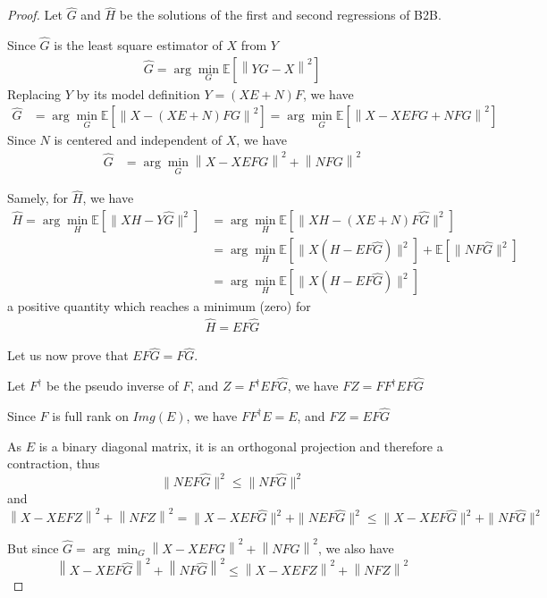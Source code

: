\documentclass{article}
\begin{document}
\begin{proof}

 Let $\hat G$ and $\hat H$ be the solutions of the first and second regressions of B2B.

 Since $\hat G$ is the least square estimator of $X$ from $Y$
 \begin{align*}
    \hat G = \arg \min_G \mathbb{E}[\left \| YG - X \right \|^2]
\end{align*}
Replacing $Y$ by its model definition $Y = (XE+N)F$, we have
 \begin{align*}
    \hat G &=   \arg \min_G \mathbb{E}[\left \| X - (XE + N)FG \right\|^2] =\arg \min_G \mathbb{E}[\left \| X - XEFG + NFG \right\|^2]
  \end{align*}
  Since $N$ is centered and independent of $X$, we have
  \begin{align}
    	  \hat G &=  \arg \min_G \left \| X - XEFG\right\| ^2  + \left \| NFG\right \| ^2
     \label{eq:Gdoublenorm}
\end{align}

Samely, for $\hat H$, we have
\begin{align*}
    \hat H = \arg \min_H \mathbb{E}[\| XH - Y \hat{G} \|^2] &=\arg  \min_H \mathbb{E}[\| XH - (XE + N)F \hat G \|^2] \\
    &=\arg \min_H \mathbb{E}[\| X(H - EF \hat G) \| ^2] + \mathbb{E}[\| NF\hat G \| ^2]\\
    &= \arg \min_H \mathbb{E}[\| X(H - EF \hat G) \| ^2]
 \end{align*}
 a positive quantity which reaches a minimum (zero) for
 \begin{align}
    \hat H = EF \hat G
    \label{eq:Hdoublenom}
\end{align}

Let us now prove that $EF\hat G = F\hat G$.

Let $F^\dagger$ be the pseudo inverse of $F$, and $Z=F^\dagger EF\hat G$, we have $FZ = FF^\dagger EF \hat G$

Since $F$ is full rank on $Img(E)$, we have $FF^\dagger E =E$, and $FZ = EF\hat G$

As $E$ is a binary diagonal matrix, it is an orthogonal projection and therefore a contraction, thus
 $$ \| NEF\hat G\|^2 \leq \| NF\hat G \|^2$$ and
 $$\left \| X - XEFZ\right \| ^2  + \left \| NFZ\right \| ^2 = \| X - XEF\hat G \| ^2  + \| NEF\hat G \| ^2 \leq \| X - XEF\hat G \| ^2  + \| NF\hat G \| ^2$$

But since $\hat G =  \arg \min_G \left \| X - XEFG\right\| ^2  + \left \| NFG\right \| ^2$, we also have
$$\left \| X - XEF\hat G\right\| ^2  + \left \| NF\hat G\right \| ^2 \leq \left \| X - XEFZ\right \| ^2  + \left \| NFZ\right \| ^2$$


\end{proof}
\end{document}
